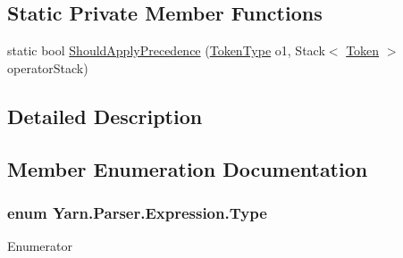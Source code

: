 \subsection*{Static Private Member Functions}
\begin{DoxyCompactItemize}
\item 
static bool \hyperlink{a00040_a5004a8eaa00b2b55856ecb4f339033fb}{Should\-Apply\-Precedence} (\hyperlink{a00026_a301aa7c866593a5b625a8fc158bbeace}{Token\-Type} o1, Stack$<$ \hyperlink{a00079}{Token} $>$ operator\-Stack)
\end{DoxyCompactItemize}


\subsection{Detailed Description}


\subsection{Member Enumeration Documentation}
\hypertarget{a00040_aceddb5496ccffe668bced2d131e4bf86}{
\subsubsection[{Type}]{\setlength{\rightskip}{0pt plus 5cm}enum {\bf Yarn.\-Parser.\-Expression.\-Type}\hspace{0.3cm}{\ttfamily [package]}}}\label{a00040_aceddb5496ccffe668bced2d131e4bf86}
\begin{Desc}
\item[Enumerator]\par
\begin{description}
\item[{\em 
\hypertarget{a00040_aceddb5496ccffe668bced2d131e4bf86a689202409e48743b914713f96d93947c}{Value}\label{a00040_aceddb5496ccffe668bced2d131e4bf86a689202409e48743b914713f96d93947c}
}]\item[{\em 
\hypertarget{a00040_aceddb5496ccffe668bced2d131e4bf86affb017548928ab2305e7c55cb67c04ca}{Function\-Call}\label{a00040_aceddb5496ccffe668bced2d131e4bf86affb017548928ab2305e7c55cb67c04ca}
}]\end{description}
\end{Desc}


